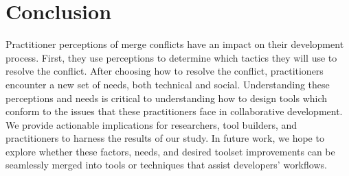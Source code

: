 \section{Conclusion}\label{conclusion}
Practitioner perceptions of merge conflicts have an impact on their development process. First, they use perceptions to determine which tactics they will use to resolve the conflict.
After choosing how to resolve the conflict, practitioners encounter a new set of needs, both technical and social. 
Understanding these perceptions and needs is critical to understanding how to design tools which conform to the issues that these practitioners face in collaborative development.
We provide actionable implications for researchers, tool builders, and practitioners to harness the results of our study.
In future work, we hope to explore whether these factors, needs, and desired toolset improvements can be seamlessly merged into tools or techniques that assist developers' workflows.

%
%
